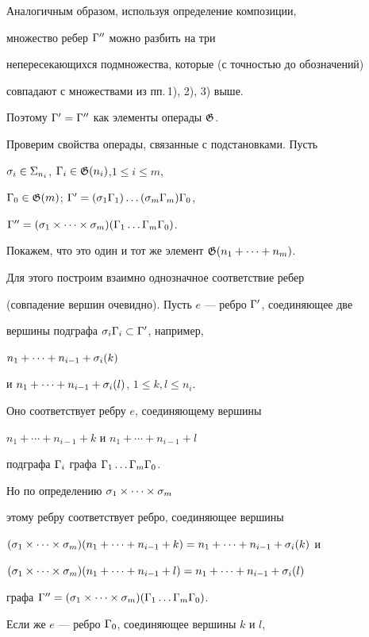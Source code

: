 \begin{pf}
Аналогичным образом, используя определение композиции, 


множество ребер ${\Gamma}''$ можно разбить на три 


непересекающихся подмножества, которые (с точностью до обозначений) 


совпадают с множествами из пп.\,1), 2), 3) выше. 


Поэтому ${\Gamma}'={\Gamma}''$ как элементы операды ${\frak G}$.





Проверим свойства операды, связанные с подстановками. Пусть 


$\sigma_i\in \Sigma_{n_i}$, ${\Gamma}_i\in {\frak G} (n_i)$,\linebreak $1\leq i\leq m$,


${\Gamma}_0\in {\frak G} (m)$; ${\Gamma}'=(\sigma_1{\Gamma}_1)\dotsc (\sigma_m{\Gamma}_m){\Gamma}_0$, 


${\Gamma}''=(\sigma_1\times \dotsb \times \sigma_m)({\Gamma}_1\dotsc {\Gamma}_m{\Gamma}_0)$. 


Покажем, что это один и тот же элемент ${\frak G} (n_1+\dotsb +n_m)$. 


Для этого построим взаимно однозначное соответствие ребер 


(совпадение вершин очевидно). Пусть $e$ --- ребро ${\Gamma}'$, соединяющее две 


вершины подграфа $\sigma_i{\Gamma}_i\subset {\Gamma}'$, например,


$n_1+\dotsb +n_{i-1}+\sigma_i(k)$ 


и $n_1+\dotsb +n_{i-1}+\sigma_i(l)$, $1\leq k, l\leq n_i$. 


Оно соответствует ребру $e$, соединяющему вершины 


$n_1+\dotsb +n_{i-1}+k$ и $n_1+\dotsb +n_{i-1}+l$


подграфа ${\Gamma}_i$ графа ${\Gamma}_1\dotsc {\Gamma}_m{\Gamma}_0$.   


Но по определению $\sigma_1\times \dotsb \times \sigma_m$ 


этому ребру соответствует ребро, соединяющее вершины


$(\s_1\times \dotsb \times \s_m)(n_1+\dotsb +n_{i-1}+k)=


n_1+\dotsb +n_{i-1}+\s_i(k)$ и 


$(\s_1\times \dotsb \times \s_m)(n_1+\dotsb +n_{i-1}+l)=


n_1+\dotsb +n_{i-1}+\s_i(l)$


графа ${\Gamma}''=(\sigma_1\times \dotsb \times \sigma_m)({\Gamma}_1\dotsc {\Gamma}_m{\Gamma}_0)$.


Если же $e$ --- ребро ${\Gamma}_0$, соединяющее вершины $k$ и $l$,



\end{pf}
